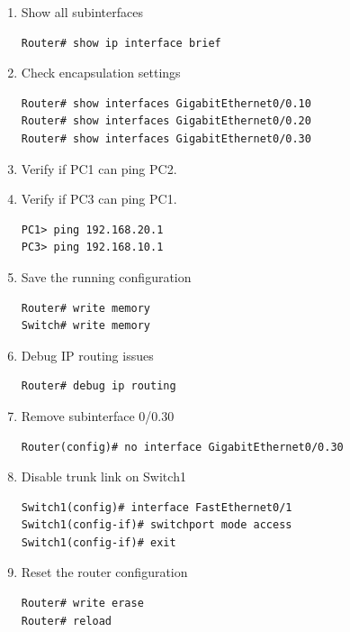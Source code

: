 \documentclass[a4paper]{book}
\begin{document}
\begin{enumerate}
\item{Show all subinterfaces}

\begin{lstlisting}
Router# show ip interface brief
\end{lstlisting}

\item{Check encapsulation settings}

\begin{lstlisting}
Router# show interfaces GigabitEthernet0/0.10
Router# show interfaces GigabitEthernet0/0.20
Router# show interfaces GigabitEthernet0/0.30
\end{lstlisting}

\item{Verify if PC1 can ping PC2.}
\item{Verify if PC3 can ping PC1.}
 
\begin{lstlisting}
PC1> ping 192.168.20.1
PC3> ping 192.168.10.1
\end{lstlisting}

\item{Save the running configuration}

\begin{lstlisting}
Router# write memory
Switch# write memory
\end{lstlisting}

\item{Debug IP routing issues}

\begin{lstlisting}
Router# debug ip routing
\end{lstlisting}

\item{Remove subinterface 0/0.30}

\begin{lstlisting}
Router(config)# no interface GigabitEthernet0/0.30
\end{lstlisting}

\item{Disable trunk link on Switch1}

\begin{lstlisting}
Switch1(config)# interface FastEthernet0/1
Switch1(config-if)# switchport mode access
Switch1(config-if)# exit
\end{lstlisting}

\item{Reset the router configuration}

\begin{lstlisting}
Router# write erase
Router# reload
\end{lstlisting}

\end{enumerate}
\end{document}
